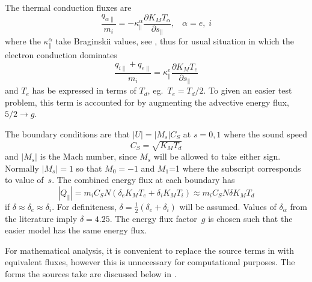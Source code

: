 The thermal conduction fluxes are
\begin{equation}\label{eq:qei}
\frac{q_{\alpha\|}}{m_i}= -\kappa^\alpha_{\|} \frac{\partial K_M T_\alpha}{\partial s_{\|}},\;\;\;\alpha=e,\;i
\end{equation}
where the $\kappa^\alpha_{\|}$ take Braginskii values, see , thus for usual situation
in which the electron conduction dominates
\begin{equation}\label{eq:qeisum}
\frac{q_{i\|} + q_{e\|}}{m_i}= \kappa^e_{\|} \frac{\partial K_M T_e}{\partial s_{\|}}
\end{equation}
and  $T_e$ has be expressed in terms of $T_d$, eg.\ $T_e=T_d/2$. To given an easier test
problem, this term is accounted for by augmenting the advective energy flux, $5/2\rightarrow g$.

The boundary conditions are that $|U|=|M_s| C_S$ at $s=0,1$ where the sound speed
\begin{equation}
C_S= \sqrt{K_M T_d}
\end{equation}
and $|M_s|$ is the Mach number, since $M_s$ will be allowed to take either sign. Normally $|M_s|=1$
so that $M_0=-1$ and $M_1$=1 where the subscript corresponds to value of~$s$.
The combined energy flux at each boundary has
\begin{equation}
|Q_{\|}|=m_i C_S N (\delta_e K_M T_e + \delta_i K_M T_i) \approx
m_i C_S N \delta K_M T_d
\end{equation}
if $\delta \approx \delta_e \approx \delta_i$. For definiteness, $\delta=\frac{1}{2}(\delta_e+\delta_i)$
will be assumed. Values of $\delta_\alpha$ from the literature imply $\delta=4.25$.
The energy flux factor~$g$ is chosen such that the easier model has the same energy flux.

For mathematical analysis, it is convenient to replace the source terms in 
with equivalent fluxes, however this is unnecessary for computational purposes.
The forms the sources take are discussed below in . 

